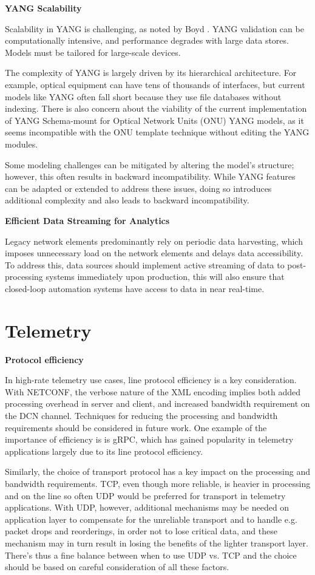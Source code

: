 \documentclass[10pt,sigconf]{iabart}
\begin{document}
\textbf{YANG Scalability}

Scalability in YANG is challenging, as noted by Boyd \cite{boyd2023scalable}. YANG validation can be computationally intensive, and performance degrades with large data stores. Models must be tailored for large-scale devices.

The complexity of YANG is largely driven by its hierarchical architecture. For example, optical equipment can have tens of thousands of interfaces, but current models like YANG often fall short because they use file databases without indexing. There is also concern about the viability of the current implementation of YANG Schema-mount \cite{RFC8528} for Optical Network Units (ONU) YANG models, as it seems incompatible with the ONU template technique without editing the YANG modules.

Some modeling challenges can be mitigated by altering the model's structure; however, this often results in backward incompatibility. While YANG features can be adapted or extended to address these issues, doing so introduces additional complexity and also leads to backward incompatibility.

\textbf{Efficient Data Streaming for Analytics}

Legacy network elements predominantly rely on periodic data harvesting, which imposes unnecessary load on the network elements and delays data accessibility. To address this, data sources should implement active streaming of data to post-processing systems immediately upon production, this will also ensure that closed-loop automation systems have access to data in near real-time.

\section{Telemetry} \label{telemetry}


\textbf{Protocol efficiency} 

In high-rate telemetry use cases, line protocol efficiency is a key consideration. With NETCONF, the verbose nature of the XML encoding implies both added processing overhead in server and client, and increased bandwidth requirement on the DCN channel. Techniques for reducing the processing and bandwidth requirements should be considered in future work. One example of the importance of efficiency is is gRPC, which has gained popularity in telemetry applications largely due to its line protocol efficiency.

Similarly, the choice of transport protocol has a key impact on the processing and bandwidth requirements. TCP, even though more reliable, is heavier in processing and on the line so often UDP would be preferred for transport in telemetry applications. With UDP, however, additional mechanisms may be needed on application layer to compensate for the unreliable transport and to handle e.g. packet drops and reorderings, in order not to lose critical data, and these mechanism may in turn result in losing the benefits of the lighter transport layer. There's thus a fine balance between when to use UDP vs. TCP and the choice should be based on careful consideration of all these factors.
\end{document}
